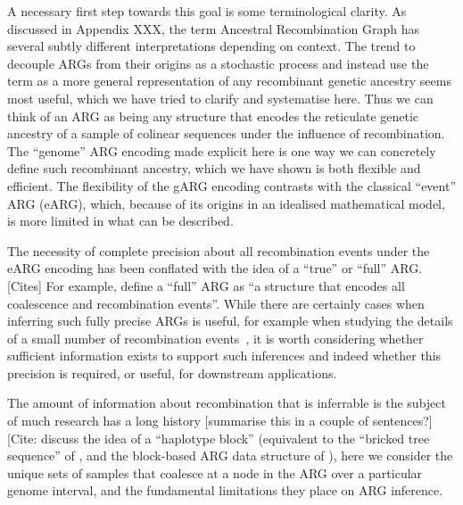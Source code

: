 \documentclass{article}
\begin{document}
A necessary first step towards this goal is some terminological
clarity. As discussed in Appendix XXX, the term Ancestral Recombination
Graph has several
subtly different interpretations depending on context.
The trend to decouple ARGs from their origins as a stochastic
process and instead use the term as a more general representation of any
recombinant genetic ancestry seems most useful, which we have
tried to clarify and systematise here. Thus
we can think of an ARG as being any structure that encodes the
reticulate genetic ancestry of a sample of colinear sequences under
the influence of recombination. The ``genome'' ARG encoding
made explicit here is one way we can concretely
define such recombinant ancestry, which we have shown is both
flexible and efficient.
The flexibility of the gARG encoding contrasts with the classical
``event'' ARG (eARG), which, because of its origins in an idealised
mathematical model, is more limited in what can be described.

The necessity of complete precision about all recombination
events under the eARG encoding has been
conflated with the idea of a ``true'' or ``full'' ARG. [Cites]
For example, \citet{brandt2021evaluation} define a ``full'' ARG as
``a structure that encodes all
coalescence and recombination events''. While there are certainly cases
when inferring such fully precise ARGs is useful, for example when
studying the details of a small number of recombination
events~\citep{rasmussen2022espalier}, it is worth considering
whether sufficient information exists to support such inferences
and indeed whether this precision is required, or useful,
for downstream applications.

The amount of information about recombination that is inferrable
is the subject of much research
has a long history [summarise this in a couple of sentences?]
[Cite: \citep{myers2002detection,hayman2023recoverability}
\cite{shipilina2023origin} discuss the idea of a ``haplotype block''
(equivalent to the ``bricked tree sequence'' of
\cite{nowbandegani2023extremely},
and the block-based ARG data structure of
\citep{palamara2016argon}),
here we consider the unique sets of
samples that coalesce at a node in the ARG over a particular
genome interval, and the fundamental limitations they place
on ARG inference.

\end{document}
